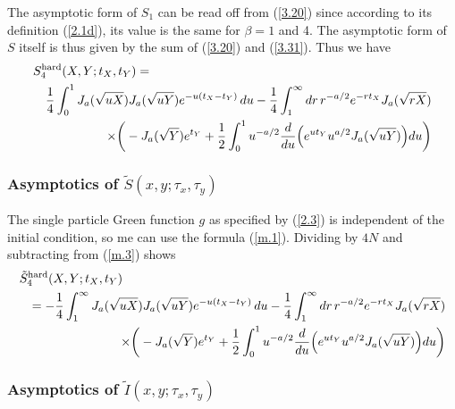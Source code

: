 The asymptotic form of $S_{1}$ can be read off from (\ref{3.20}) 
since according to its 
definition (\ref{2.1d}), 
its value is the same for $\beta = 1$ and 4.  The asymptotic form of 
$S$ itself is thus given by the sum of (\ref{3.20}) and (\ref{3.31}).  
Thus we have
\begin{eqnarray}\lefteqn{
S_4^{\rm hard}(X,Y;t_X,t_Y) = } \nonumber \\ &  & {1 \over 4} \int_0^1
J_a(\sqrt{uX}) J_a(\sqrt{uY}) e^{-u(t_X - t_Y)} \, du
- {1 \over 4} \int_1^\infty dr \, r^{-a/2} e^{-r t_X}
J_a(\sqrt{rX}) \nonumber \\ &&
\times \bigg ( - J_a(\sqrt{Y}) e^{t_Y} + {1 \over 2}
\int_0^1 u^{-a/2} {d \over du} \Big ( e^{ut_Y} u^{a/2}
J_a(\sqrt{uY}) \Big ) du \bigg ) \label{m.3}
\end{eqnarray}

\subsubsection*{Asymptotics of $\tilde{S}(x, y; \tau_{x}, \tau_{y})$}
The single particle Green function $g$ as specified by (\ref{2.3})
is independent of the initial condition, so me can use the formula
(\ref{m.1}). Dividing by $4N$ and subtracting from (\ref{m.3}) shows
\begin{eqnarray}\lefteqn{
\tilde{S}_4^{\rm hard}(X,Y;t_X,t_Y)} 
\nonumber \\ && =  - {1 \over 4} \int_1^\infty
J_a(\sqrt{uX}) J_a(\sqrt{uY}) e^{-u(t_X - t_Y)} \, du
- {1 \over 4} \int_1^\infty dr \, r^{-a/2} e^{-r t_X}
J_a(\sqrt{rX}) \nonumber \\ &&
\times \bigg ( - J_a(\sqrt{Y}) e^{t_Y} + {1 \over 2}
\int_0^1 u^{-a/2} {d \over du} \Big ( e^{ut_Y} u^{a/2}
J_a(\sqrt{uY}) \Big ) du \bigg ) \label{m.4}
\end{eqnarray}
\subsubsection*{Asymptotics of $\tilde{I}(x, y; \tau_{x}, \tau_{y})$}

